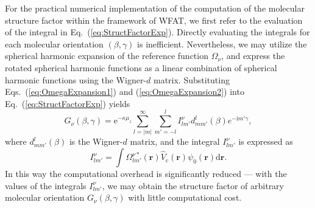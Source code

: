 \documentclass[preprint,12pt]{elsarticle} %
\newcommand{\bn}[1]{\mathbf{#1}}    %
\renewcommand{\rm}[1]{\mathrm{#1}}    %
\newcommand{\dd}{\mathrm{d}}    %
\newcommand{\ii}{\mathrm{i}}    %
\newcommand{\ee}{\mathrm{e}}    %
\begin{document}
For the practical numerical implementation of the computation of the molecular structure factor within the framework of WFAT, we first refer to the evaluation of the integral in Eq.~(\ref{eq:StructFactorExp}). Directly evaluating the integrals for each molecular orientation $(\beta,\gamma)$ is inefficient. Nevertheless, we may utilize the spherical harmonic expansion of the reference function $\Omega_\nu$, and express the rotated spherical harmonic functions as a linear combination of spherical harmonic functions using the Wigner-$d$ matrix. Substituting Eqs.~(\ref{eq:OmegaExpansion1}) and (\ref{eq:OmegaExpansion2}) into Eq.~(\ref{eq:StructFactorExp}) yields \cite{madsen_structure_2017}
\begin{equation}
    G_\nu(\beta,\gamma) = \ee^{-\kappa \mu_z} \sum_{l=|m|}^{\infty} \sum_{m'=-l}^l I_{l m'}^\nu  d_{m m'}^l(\beta) e^{-\ii m' \gamma},
\end{equation}
where $d_{m m'}^l(\beta)$ is the Wigner-$d$ matrix, and the integral $I_{l m'}^\nu$ is expressed as
\begin{equation}
    I_{l m'}^\nu = \int \Omega_{l m'}^{\nu *}(\bn{r}) \hat{V}_{\rm{c}}(\bn{r}) \psi_0(\bn{r}) \dd \bn{r}.
    \label{eq:IntegralExpr}
\end{equation}
In this way the computational overhead is significantly reduced --- with the values of the integrals $I_{l m'}^\nu$, we may obtain the structure factor of arbitrary molecular orientation $G_\nu(\beta,\gamma)$ with little computational cost.
\end{document}
